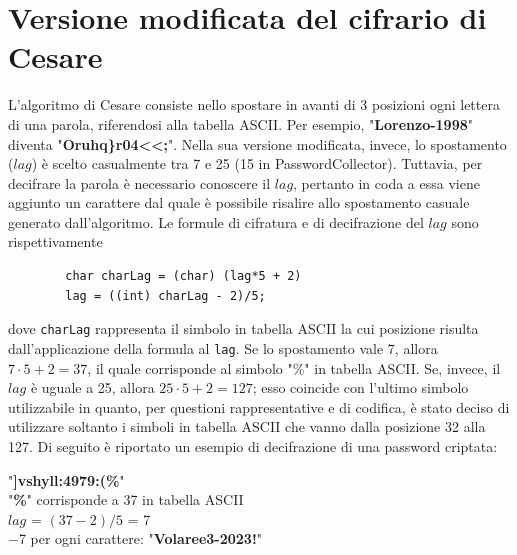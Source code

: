 \documentclass[a4paper, 12pt, one column, aas_macros]{article}
\begin{document}
	\section{Versione modificata del cifrario di Cesare}
	L'algoritmo di Cesare consiste nello spostare in avanti di \num{3} posizioni ogni lettera di una parola, riferendosi alla tabella ASCII. Per esempio, "\textbf{Lorenzo-1998}" diventa "\textbf{Oruhq\}r04<<;}". Nella sua versione modificata, invece, lo spostamento ($lag$) è scelto casualmente tra \num{7} e \num{25} (\num{15} in PasswordCollector). Tuttavia, per decifrare la parola è necessario conoscere il $lag$, pertanto in coda a essa viene aggiunto un carattere dal quale è possibile risalire allo spostamento casuale generato dall'algoritmo. Le formule di cifratura e di decifrazione del $lag$ sono rispettivamente
	\begin{verbatim}
		char charLag = (char) (lag*5 + 2)
		lag = ((int) charLag - 2)/5;
	\end{verbatim}
	dove \verb|charLag| rappresenta il simbolo in tabella ASCII la cui posizione risulta dall'applicazione della formula al \verb|lag|. Se lo spostamento vale \num{7}, allora $7\cdot5 + 2 = 37$, il quale corrisponde al simbolo "\%" in tabella ASCII. Se, invece, il $lag$ è uguale a \num{25}, allora $25\cdot5 + 2 = 127$; esso coincide con l'ultimo simbolo utilizzabile in quanto, per questioni rappresentative e di codifica, è stato deciso di utilizzare soltanto i simboli in tabella ASCII che vanno dalla posizione \num{32} alla \num{127}. Di seguito è riportato un esempio di decifrazione di una password criptata:
	\begin{center}
		"\textbf{]vshyll:4979:(\%}"\\
		"\textbf{\%}" corrisponde a \num{37} in tabella ASCII\\
		$lag$ = $(37-2)/5$ = 7\\
		\num{-7} per ogni carattere: "\textbf{Volaree3-2023!}"
	\end{center}
	
\end{document}
